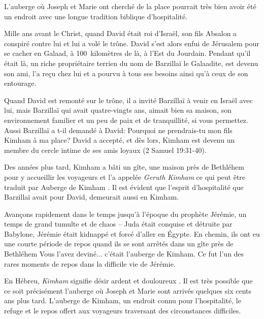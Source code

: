 

L'auberge où Joseph et Marie ont cherché de la place pourrait très bien avoir été un endroit avec une longue tradition biblique d'hospitalité.

Mille ans avant le Christ, quand David était roi d'Israël, son fils Absalon a conspiré contre lui et lui a volé le trône. David s'est alors enfui de Jérusalem pour se cacher en Galaad, à 100~kilomètres de là, à l'Est du Jourdain. Pendant qu'il était là, un riche propriétaire terrien du nom de Barzillaï le Galaadite, est devenu son ami, l'a reçu chez lui et a pourvu à tous ses besoins ainsi qu'à ceux de son entourage.

Quand David est remonté sur le trône, il a invité Barzillaï à venir en Israël avec lui, mais Barzillaï qui avait quatre-vingts ans, aimait bien sa maison, son environnement familier \og et un peu de paix et de tranquillité, si vous permettez. \fg{} Aussi Barzillaï a t-il demandé à David: \og Pourquoi ne prendrais-tu mon fils Kimham à ma place? \fg{} David a accepté, et dès lors, Kimham est devenu un membre du cercle intime de ses amis loyaux (2 Samuel 19:31-40).

Des années plus tard, Kimham a bâti un gîte, une maison près de Bethléhem pour y accueillir les voyageurs et l'a appelée \emph{Geruth Kimham} ce qui peut être traduit par \og Auberge de Kimham \fg{}. Il est évident que l'esprit d'hospitalité que Barzillaï avait pour David, demeurait aussi en Kimham.

Avançons rapidement dans le temps jusqu'à l'époque du prophète Jérémie, un temps de grand tumulte et de chaos – Juda était conquise et détruite par Babylone, Jérémie était kidnappé et forcé d'aller en Égypte. En chemin, ils ont eu une courte période de repos quand ils se sont arrêtés dans un gîte près de Bethléhem Vous l'avez deviné... c'était l'auberge de Kimham. Ce fut l'un des rares moments de repos dans la difficile vie de Jérémie.

En Hébreu, \emph{Kimham} signifie \og désir ardent et douloureux \fg{}. Il est très possible que ce soit précisément l'auberge où Joseph et Marie sont arrivés quelques six cents ans plus tard. L'auberge de Kimham, un endroit connu pour l'hospitalité, le refuge et le repos offert aux voyageurs traversant des circonstances difficiles.

